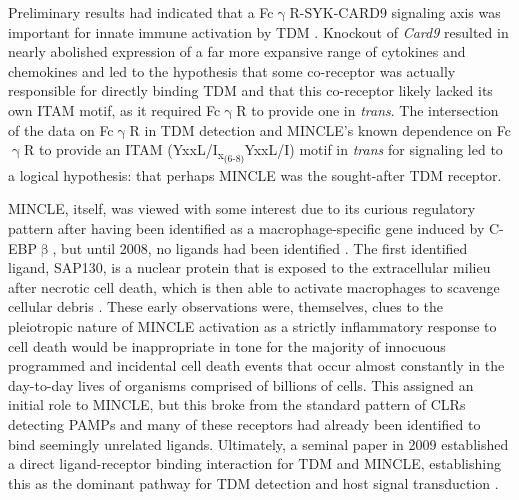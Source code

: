 Preliminary results had indicated that a Fc$\upgamma$R\hyp{}SYK\hyp{}CARD9 signaling axis was important for innate immune activation by TDM \citep{Werninghaus2009}. Knockout of \textit{Card9} resulted in nearly abolished expression of a far more expansive range of cytokines and chemokines and led to the hypothesis that some co\hyp{}receptor was actually responsible for directly binding TDM and that this co\hyp{}receptor likely lacked its own ITAM motif, as it required Fc$\upgamma$R to provide one in \textit{trans}. The intersection of the data on Fc$\upgamma$R in TDM detection \citep{Werninghaus2009} and MINCLE's known dependence on Fc$\upgamma$R to provide an ITAM (YxxL/I\textsubscript{x\textsubscript{(6\hyp{}8)}}YxxL/I) motif in \textit{trans} for signaling \citep{Yamasaki2008} led to a logical hypothesis: that perhaps MINCLE was the sought\hyp{}after TDM receptor.

MINCLE, itself, was viewed with some interest due to its curious regulatory pattern after having been identified as a macrophage-specific gene induced by C-EBP$\upbeta$, but until 2008, no ligands had been identified \citep{Balch1998, Akira1990}. The first identified ligand, SAP130, is a nuclear protein that is exposed to the extracellular milieu after necrotic cell death, which is then able to activate macrophages to scavenge cellular debris \citep{Yamasaki2008}. These early observations were, themselves, clues to the pleiotropic nature of MINCLE activation as a strictly inflammatory response to cell death would be inappropriate in tone for the majority of innocuous programmed and incidental cell death events that occur almost constantly in the day\hyp{}to\hyp{}day lives of organisms comprised of billions of cells. This assigned an initial role to MINCLE, but this broke from the standard pattern of CLRs detecting PAMPs and many of these receptors had already been identified to bind seemingly unrelated ligands. Ultimately, a seminal paper in 2009 established a direct ligand\hyp{}receptor binding interaction for TDM and MINCLE, establishing this as the dominant pathway for TDM detection and host signal transduction \citep{Ishikawa2009}. 

